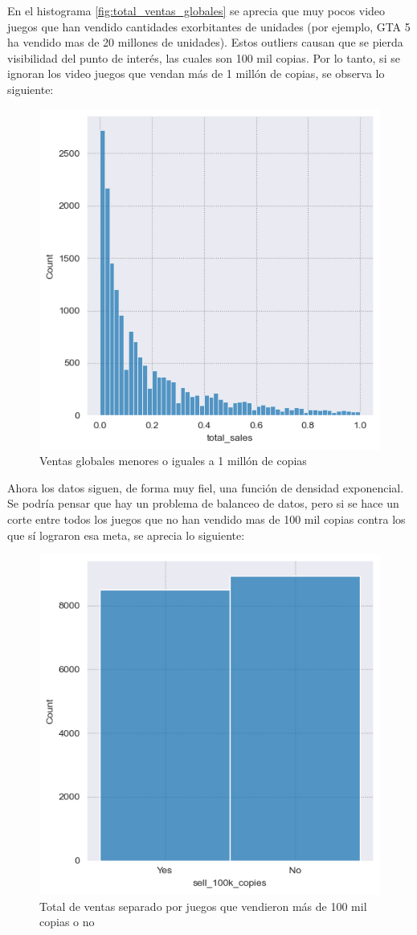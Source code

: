 \documentclass[a4paper]{article}
\begin{document}
    En el histograma \ref{fig:total_ventas_globales} se aprecia que muy pocos video juegos que han vendido cantidades exorbitantes de unidades (por ejemplo, GTA 5 ha vendido mas de 20 millones de unidades). Estos outliers causan que se pierda visibilidad del punto de interés, las cuales son 100 mil copias. Por lo tanto, si se ignoran los video juegos que vendan más de 1 millón de copias, se observa lo siguiente:\newpage

    \begin{figure}[hbtp!]
        \centering
        \includegraphics[width=0.5\linewidth]{Module_4_BigData//Proyecto//Propuestas//Imagenes/dataset2_totalVentas_menos1M_histogram.png}
        \caption{Ventas globales menores o iguales a 1 millón de copias}
        \label{fig:total_ventas_1M}
    \end{figure}

    Ahora los datos siguen, de forma muy fiel, una función de densidad exponencial. Se podría pensar que hay un problema de balanceo de datos, pero si se hace un corte entre todos los juegos que no han vendido mas de 100 mil copias contra los que sí lograron esa meta, se aprecia lo siguiente:

    \begin{figure}[hbtp!]
        \centering
        \includegraphics[width=0.5\linewidth]{Module_4_BigData//Proyecto//Propuestas//Imagenes/dataset2_totalVentas_categorizado_histogram.png}
        \caption{Total de ventas separado por juegos que vendieron m\'{a}s de 100 mil copias o no}
        \label{fig:total_ventas_categorizado}
    \end{figure}
\end{document}
